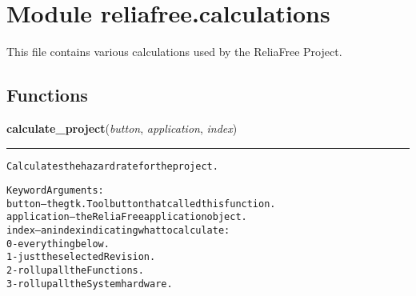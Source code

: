 %
%
%


\section{Module reliafree.calculations}

    \label{reliafree:calculations}
This file contains various calculations used by the ReliaFree Project.



  \subsection{Functions}

    \label{reliafree:calculations:calculate_project}

    \vspace{0.5ex}

\hspace{.8\funcindent}\begin{boxedminipage}{\funcwidth}

    \raggedright \textbf{calculate\_project}(\textit{button}, \textit{application}, \textit{index})

    \vspace{-1.5ex}

    \rule{\textwidth}{0.5\fboxrule}
\setlength{\parskip}{2ex}
\begin{alltt}
Calculates the hazard rate for the project.

Keyword Arguments:
button      -- the gtk.Toolbutton that called this function.
application -- the ReliaFree application object.
index       -- an index indicating what to calculate:
               0 - everything below.
               1 - just the selected Revision.
               2 - roll up all the Functions.
               3 - roll up all the System hardware.
\end{alltt}

\setlength{\parskip}{1ex}
    \end{boxedminipage}


